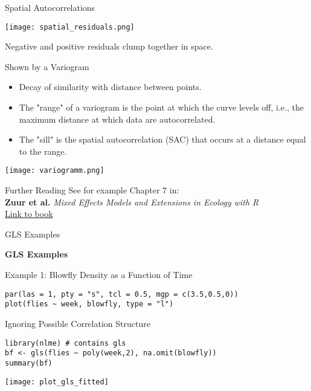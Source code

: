 \documentclass{beamer}
\begin{document}
\begin{frame}{Spatial Autocorrelations}
  \begin{center}
    \texttt{[image: spatial\_residuals.png]}
  \end{center}
  \small{Negative and positive residuals clump together in space.}
\end{frame}

\begin{frame}{Shown by a Variogram}
  \begin{itemize}
    \item Decay of similarity with distance between points.
    \item The "range" of a variogram is the point at which the curve levels off, i.e., the maximum distance at which data are autocorrelated.
    \item The "sill" is the spatial autocorrelation (SAC) that occurs at a distance equal to the range.
  \end{itemize}
  \begin{center}
    \texttt{[image: variogramm.png]} %
  \end{center}
\end{frame}

\begin{frame}{Further Reading}
  See for example Chapter 7 in: \\
  \textbf{Zuur et al.} \emph{Mixed Effects Models and Extensions in Ecology with R} \\
  \href{http://highstat.com/index.php/mixed-effects-models-and-extensions-in-ecology-with-r}{Link to book}
\end{frame}

\begin{frame}{GLS Examples}
  \begin{center}
    \textbf{GLS Examples}
  \end{center}
\end{frame}

\begin{frame}[fragile]{Example 1: Blowfly Density as a Function of Time}
  \begin{verbatim}
par(las = 1, pty = "s", tcl = 0.5, mgp = c(3.5,0.5,0))
plot(flies ~ week, blowfly, type = "l")
  \end{verbatim}
\end{frame}

\begin{frame}[fragile]{Ignoring Possible Correlation Structure}
  \begin{verbatim}
library(nlme) # contains gls
bf <- gls(flies ~ poly(week,2), na.omit(blowfly))
summary(bf)
  \end{verbatim}
  \begin{center}
    \texttt{[image: plot\_gls\_fitted]} %
  \end{center}
\end{frame}
\end{document}
